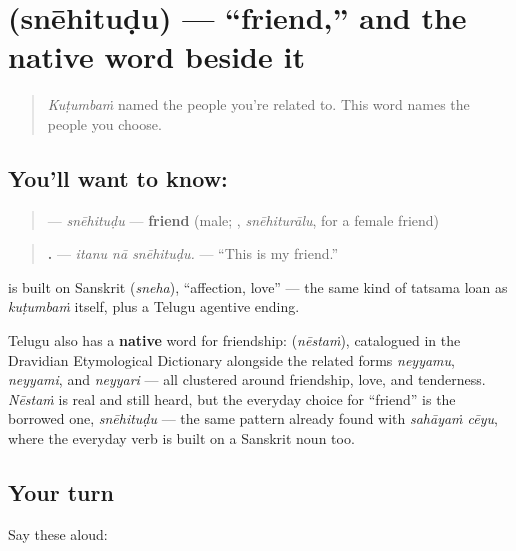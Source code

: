 \section[\texorpdfstring{\te{స్నేహితుడు} (snēhituḍu)}{స్నేహితుడు (snēhituḍu)}]{ (snēhituḍu) — \textquotedblleft{}friend,\textquotedblright{} and the native word beside it}

\label{lesson:TE-C35-snehitudu}



\begin{quote}
\emph{Kuṭumbaṁ} named the people you're related to. This word names the people you choose.
\end{quote}

\subsection*{You'll want to know: }
\begin{quote}
\textbf{} — \emph{snēhituḍu} — \textbf{friend} (male; \textbf{}, \emph{snēhiturālu}, for a female friend)
\end{quote}

\begin{quote}
\textbf{  .} — \emph{itanu nā snēhituḍu.} — \textquotedblleft{}This is my friend.\textquotedblright{}
\end{quote}

\begin{cousinweb}
\textbf{} is built on Sanskrit \textbf{} (\emph{sneha}), \textquotedblleft{}affection, love\textquotedblright{} — the same kind of tatsama loan as \emph{kuṭumbaṁ} itself, plus a Telugu agentive ending.

Telugu also has a \textbf{native} word for friendship: \textbf{} (\emph{nēstaṁ}), catalogued in the Dravidian Etymological Dictionary alongside the related forms \emph{neyyamu}, \emph{neyyami}, and \emph{neyyari} — all clustered around friendship, love, and tenderness. \emph{Nēstaṁ} is real and still heard, but the everyday choice for \textquotedblleft{}friend\textquotedblright{} is the borrowed one, \emph{snēhituḍu} — the same pattern already found with \emph{sahāyaṁ cēyu}, where the everyday verb is built on a Sanskrit noun too.
\end{cousinweb}

\subsection*{Your turn}
Say these aloud:


